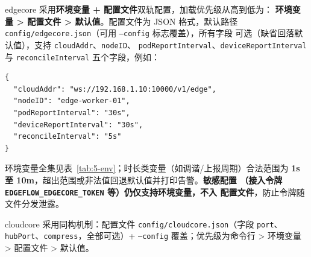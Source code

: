 edgecore 采用\textbf{环境变量 + 配置文件}双轨配置，加载优先级从高到低为：
\textbf{环境变量 > 配置文件 > 默认值}。配置文件为 JSON 格式，默认路径
\texttt{config/edgecore.json}（可用 \texttt{--config} 标志覆盖），所有字段
可选（缺省回落默认值），支持 \texttt{cloudAddr}、\texttt{nodeID}、
\texttt{podReportInterval}、\texttt{deviceReportInterval} 与
\texttt{reconcileInterval} 五个字段，例如：

\begin{lstlisting}
{
  "cloudAddr": "ws://192.168.1.10:10000/v1/edge",
  "nodeID": "edge-worker-01",
  "podReportInterval": "30s",
  "deviceReportInterval": "30s",
  "reconcileInterval": "5s"
}
\end{lstlisting}

环境变量全集见表~\ref{tab:5-env}；时长类变量（如调谐/上报周期）合法范围为
\textbf{1s 至 10m}，超出范围或非法值回退默认值并打印告警。\textbf{敏感配置
（接入令牌 \texttt{EDGEFLOW\_EDGECORE\_TOKEN} 等）仍仅支持环境变量，不入
配置文件}，防止令牌随文件分发泄露。

cloudcore 采用同构机制：配置文件 \texttt{config/cloudcore.json}（字段
\texttt{port}、\texttt{hubPort}、\texttt{compress}，全部可选）+ \texttt{--config}
覆盖；优先级为命令行 > 环境变量 > 配置文件 > 默认值。

